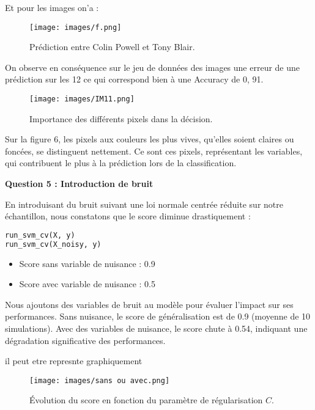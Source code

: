 \documentclass[10pt,a4paper]{article}
\begin{document}
\newpage  %
\noindent Et pour les images on'a :




\begin{figure}[h!]
    \centering
    \texttt{[image: images/f.png]}
    \caption{Prédiction entre Colin Powell et Tony Blair.}
\end{figure}

\newpage  %
\noindent On observe en conséquence sur le jeu de données des images une erreur de une prédiction sur les 12 ce qui
correspond bien à une Accuracy de 0, 91.

\begin{figure}[h!]
    \centering
    \texttt{[image: images/IM11.png]}
    \caption{Importance des différents pixels dans la décision.}
\end{figure}


Sur la figure 6, les pixels aux couleurs les plus vives, qu'elles soient claires ou foncées, se distinguent nettement. Ce sont ces pixels, représentant les variables, qui contribuent le plus à la prédiction lors de la classification.






\textbf{Question 5 : Introduction de bruit}

En introduisant du bruit suivant une loi normale centrée réduite sur notre échantillon, nous constatons que le score diminue drastiquement :

\begin{lstlisting}[language=Python, caption=Impact du bruit sur le score]
run_svm_cv(X, y)
run_svm_cv(X_noisy, y)
\end{lstlisting}

\begin{itemize}
    \item Score sans variable de nuisance : 0.9
    \item Score avec variable de nuisance : 0.5
\end{itemize}
 Nous ajoutons des variables de bruit au modèle pour évaluer l'impact sur ses performances. Sans nuisance, le score de généralisation est de 0.9 (moyenne de 10 simulations). Avec des variables de nuisance, le score chute à 0.54, indiquant une dégradation significative des performances. 


il peut etre represnte graphiquement 

 \begin{figure}[h!]
    \centering
    \texttt{[image: images/sans ou avec.png]}
    \caption{Évolution du score en fonction du paramètre de régularisation $C$.}
\end{figure}
\end{document}
